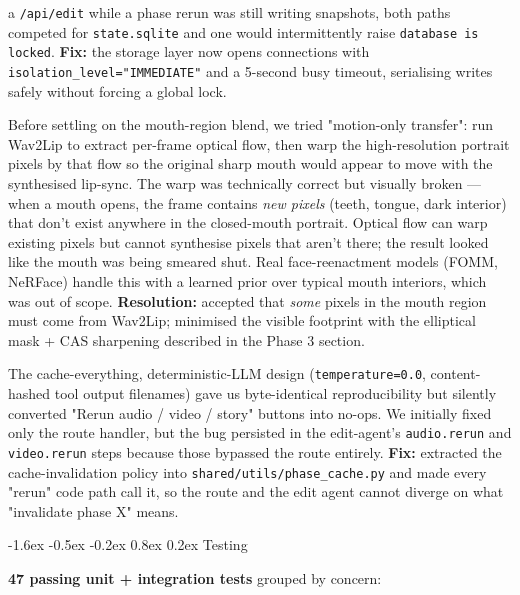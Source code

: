 \documentclass[11pt,a4paper]{article}
\makeatletter
\renewcommand\section{\@startsection{section}{1}{\z@}%
   {-1.6ex \@plus -0.5ex \@minus -0.2ex}%
   {0.8ex \@plus 0.2ex}%
   {\Large\bfseries\color{accent}}}
\newcommand{\code}[1]{\texttt{\small #1}}
\makeatother
\begin{document}
\begin{description}
    a \code{/api/edit} while a phase rerun was still writing snapshots, both
    paths competed for \code{state.sqlite} and one would intermittently raise
    \code{database is locked}. \textbf{Fix:} the storage layer now opens
    connections with \code{isolation\_level="IMMEDIATE"} and a 5-second busy
    timeout, serialising writes safely without forcing a global lock.
  \item[Wav2Lip motion-warp dead end.] Before settling on the mouth-region
    blend, we tried "motion-only transfer": run Wav2Lip to extract per-frame
    optical flow, then warp the high-resolution portrait pixels by that flow
    so the original sharp mouth would appear to move with the synthesised
    lip-sync. The warp was technically correct but visually broken --- when
    a mouth opens, the frame contains \emph{new pixels} (teeth, tongue, dark
    interior) that don't exist anywhere in the closed-mouth portrait. Optical
    flow can warp existing pixels but cannot synthesise pixels that aren't
    there; the result looked like the mouth was being smeared shut. Real
    face-reenactment models (FOMM, NeRFace) handle this with a learned prior
    over typical mouth interiors, which was out of scope. \textbf{Resolution:}
    accepted that \emph{some} pixels in the mouth region must come from
    Wav2Lip; minimised the visible footprint with the elliptical mask + CAS
    sharpening described in the Phase 3 section.
  \item[Determinism vs. user expectation on reruns.] The cache-everything,
    deterministic-LLM design (\code{temperature=0.0}, content-hashed tool
    output filenames) gave us byte-identical reproducibility but silently
    converted "Rerun audio / video / story" buttons into no-ops. We
    initially fixed only the route handler, but the bug persisted in the
    edit-agent's \code{audio.rerun} and \code{video.rerun} steps because
    those bypassed the route entirely. \textbf{Fix:} extracted the
    cache-invalidation policy into \code{shared/utils/phase\_cache.py} and
    made every "rerun" code path call it, so the route and the edit agent
    cannot diverge on what "invalidate phase X" means.
\end{description}

\section{Testing}

\textbf{47 passing unit + integration tests} grouped by concern:
\end{document}
